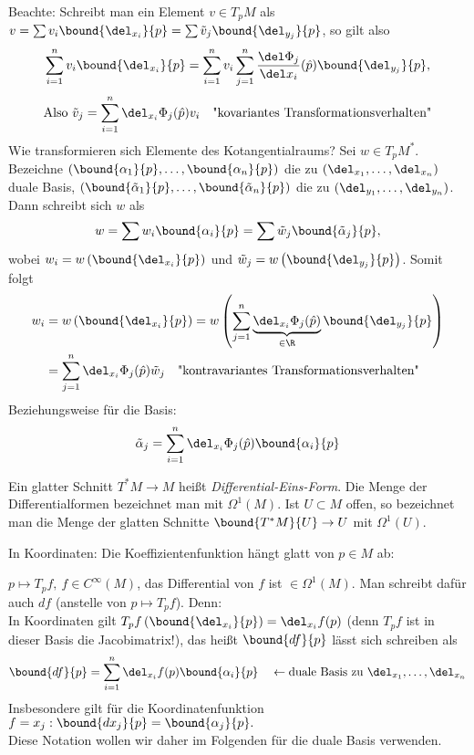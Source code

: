 \begin{rem}\label{3.22}
	Beachte: Schreibt man ein Element $v \in T_pM$ als $ v = \sum v_i \bound{\del_{x_i}}{p} = \sum \tilde{v}_j \bound{\del_{y_j}}{p} $, so gilt also
	\[ \sum_{i=1}^{n} v_i \bound{\del_{x_i}}{p} = \sum_{i=1}^{n} v_i \sum_{j=1}^n \frac{\del\Phi_j}{\del x_i}(\hat{p}) \bound{\del_{y_j}}{p}, \]
	\[ \text{Also } \tilde{v}_j = \sum_{i=1}^n \del_{x_i} \Phi_j(\hat{p}) v_i\quad \text{"kovariantes Transformationsverhalten"} \]
	Wie transformieren sich Elemente des Kotangentialraums? Sei $w \in T_pM^*$. Bezeichne $ (\bound{\alpha_1}{p},\dotsc, \bound{\alpha_n}{p}) $ die zu $ (\del_{x_1},\dotsc, \del_{x_n}) $ duale Basis, $ (\bound{\tilde{\alpha}_1}{p},\dotsc, \bound{\tilde{\alpha}_n}{p}) $ die zu $ (\del_{y_1},\dotsc, \del_{y_n}) $. Dann schreibt sich $w$ als 
	\[ w = \sum w_i \bound{\alpha_i}{p} = \sum \tilde{w}_j \bound{\tilde{\alpha}_j}{p}, \]
	wobei $w_i = w \left( \bound{\del_{x_i}}{p} \right)$ und $\tilde{w}_j = w \left( \bound{\del_{y_j}}{p} \right)$. Somit folgt
	\begin{align*}
		w_i &= w \left( \bound{\del_{x_i}}{p} \right) = w \left( \sum_{j=1}^n \underbrace{\del_{x_i} \Phi_j(\hat{p})}_{\in \R} \bound{\del_{y_j}}{p} \right)\\
		&= \sum_{j=1}^n \del_{x_i} \Phi_j(\hat{p}) \tilde{w}_j\quad \text{"kontravariantes Transformationsverhalten"}
	\end{align*}
	Beziehungsweise für die Basis:
	\[ \tilde{\alpha}_j = \sum_{i=1}^n \del_{x_i}\Phi_j (\hat{p}) \bound{\alpha_i}{p} \]
\end{rem}

\begin{defn}
	Ein glatter Schnitt $T^*M \to M$ heißt \emph{Differential-Eins-Form}. Die Menge der Differentialformen bezeichnet man mit $\Omega^1(M)$. Ist $U \subset M$ offen, so bezeichnet man die Menge der glatten Schnitte $ \bound{T^*M}{U} \to U $ mit $\Omega^1(U)$.
\end{defn}

In Koordinaten: Die Koeffizientenfunktion hängt glatt von $p \in M$ ab:

\begin{exmp*}
	$p \mapsto T_pf,\ f \in C^\infty(M)$, das Differential von $f$ ist $\in \Omega^1(M)$. Man schreibt dafür auch $df$ (anstelle von $p \mapsto T_pf$). Denn:\\
	In Koordinaten gilt $ T_pf \left( \bound{\del_{x_i}}{p} \right) = \del_{x_i} f(p) $ (denn $T_pf$ ist in dieser Basis die Jacobimatrix!), das heißt $\bound{df}{p}$ lässt sich schreiben als
	\[ \bound{df}{p} = \sum_{i=1}^n \del_{x_i} f(p) \bound{\alpha_i}{p} \quad \leftarrow \text{duale Basis zu }\del_{x_1},\dotsc, \del_{x_n} \]
	Insbesondere gilt für die Koordinatenfunktion $ f = x_j: \bound{dx_j}{p} = \bound{\alpha_j}{p}. $\\
	Diese Notation wollen wir daher im Folgenden für die duale Basis verwenden.
\end{exmp*}

